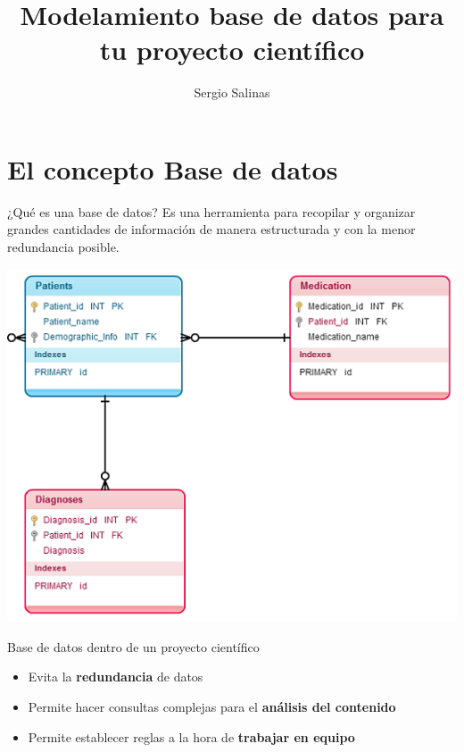 \documentclass[11pt]{beamer}
\author{Sergio Salinas}
\title{Modelamiento base de datos para tu proyecto científico}
\begin{document}
\begin{frame}
\titlepage
\end{frame}

\begin{frame}
\tableofcontents
\end{frame}

\section{El concepto Base de datos}

\begin{frame}{¿Qué es una base de datos?}
Es una herramienta para recopilar y organizar grandes cantidades de información de manera estructurada y con la menor redundancia posible.

\begin{center}
\includegraphics[scale=0.5]{images/relational-database-model1.png} 

\end{center}

\end{frame}

\begin{frame}{Base de datos dentro de un proyecto científico}

\begin{itemize}

\item  Evita la \textbf{redundancia} de datos
\item Permite hacer consultas complejas para el \textbf{análisis del contenido}
\item Permite establecer reglas a la hora de \textbf{trabajar en equipo}
\end{itemize}

\end{frame}
\end{document}
